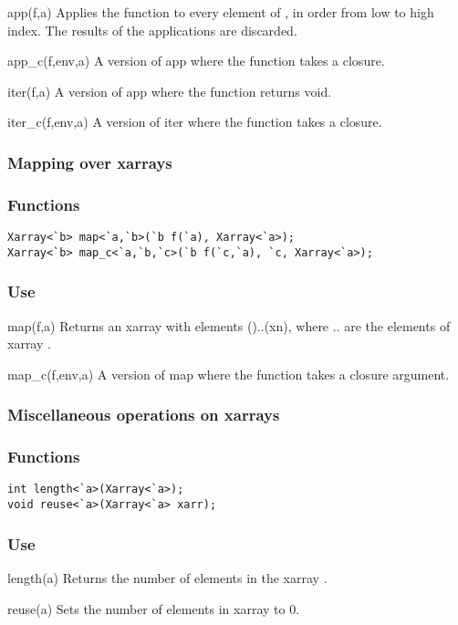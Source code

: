 \begin{defun}{app}{(f,a)}
Applies the function  to every element of , in order from
low to high index.  The results of the applications are discarded.
\end{defun}

\begin{defun}{app_c}{(f,env,a)}
A version of app where the function  takes a closure.
\end{defun}

\begin{defun}{iter}{(f,a)}
A version of app where the function  returns void.
\end{defun}

\begin{defun}{iter_c}{(f,env,a)}
A version of iter where the function  takes a closure.
\end{defun}

\subsubsection*{Mapping over xarrays}
\subsubsection*{Functions}
\begin{verbatim}
Xarray<`b> map<`a,`b>(`b f(`a), Xarray<`a>);
Xarray<`b> map_c<`a,`b,`c>(`b f(`c,`a), `c, Xarray<`a>);
\end{verbatim}

\subsubsection*{Use}

\begin{defun}{map}{(f,a)}
Returns an xarray with elements ()..(xn), where
.. are the elements of xarray .
\end{defun}

\begin{defun}{map_c}{(f,env,a)}
A version of map where the function  takes a closure argument.
\end{defun}

\subsubsection*{Miscellaneous operations on xarrays}
\subsubsection*{Functions}
\begin{verbatim}
int length<`a>(Xarray<`a>);
void reuse<`a>(Xarray<`a> xarr);
\end{verbatim}

\subsubsection*{Use}

\begin{defun}{length}{(a)}
Returns the number of elements in the xarray .
\end{defun}

\begin{defun}{reuse}{(a)}
Sets the number of elements in xarray  to 0.
\end{defun}

